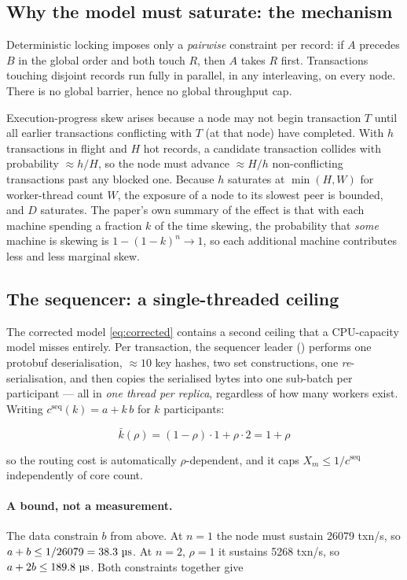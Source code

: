 \documentclass[11pt,a4paper]{article}
\newcommand{\pernode}{X_m}
\newcommand{\msecs}{\ensuremath{\,\text{\textmu}\text{s}}}
\newcommand{\srcfile}[1]{\texttt{\footnotesize\detokenize{#1}}}
\begin{document}
\subsection{Why the model must saturate: the mechanism}

Deterministic locking imposes only a \emph{pairwise} constraint per record: if
$A$ precedes $B$ in the global order and both touch $R$, then $A$ takes $R$
first. Transactions touching disjoint records run fully in parallel, in any
interleaving, on every node. There is no global barrier, hence no global
throughput cap.

Execution-progress skew arises because a node may not begin transaction $T$
until all earlier transactions conflicting with $T$ (at that node) have
completed. With $h$ transactions in flight and $H$ hot records, a candidate
transaction collides with probability $\approx h/H$, so the node must advance
$\approx H/h$ non-conflicting transactions past any blocked one. Because $h$
saturates at $\min(H, W)$ for worker-thread count $W$, the exposure of a node to
its slowest peer is bounded, and $D$ saturates. The paper's own summary of the
effect is that with each machine spending a fraction $k$ of the time skewing,
the probability that \emph{some} machine is skewing is
$1-(1-k)^n \to 1$, so each additional machine contributes less and less
marginal skew.

\subsection{The sequencer: a single-threaded ceiling}
\label{sec:seq}

The corrected model \eqref{eq:corrected} contains a second ceiling that a
CPU-capacity model misses entirely. Per transaction, the sequencer leader
(\srcfile{sequencer.cc:187}) performs one protobuf deserialisation, $\approx10$
key hashes, two set constructions, one \emph{re}-serialisation, and then
copies the serialised bytes into one sub-batch per participant --- all in
\emph{one thread per replica}, regardless of how many workers exist. Writing
$c^{\text{seq}}(k) = a + k\,b$ for $k$ participants:

$$\bar{k}(\rho) = (1-\rho)\cdot 1 + \rho\cdot 2 = 1+\rho$$

so the routing cost is automatically $\rho$-dependent, and it caps
$\pernode \le 1/c^{\text{seq}}$ independently of core count.

\paragraph{A bound, not a measurement.} The data constrain $b$ from above. At
$n{=}1$ the node must sustain \num{26079} txn/s, so
$a+b \le 1/26079 = \SI{38.3}{\msecs}$. At $n{=}2$, $\rho{=}1$ it sustains
\num{5268} txn/s, so $a+2b \le \SI{189.8}{\msecs}$. Both constraints together
give
\end{document}
